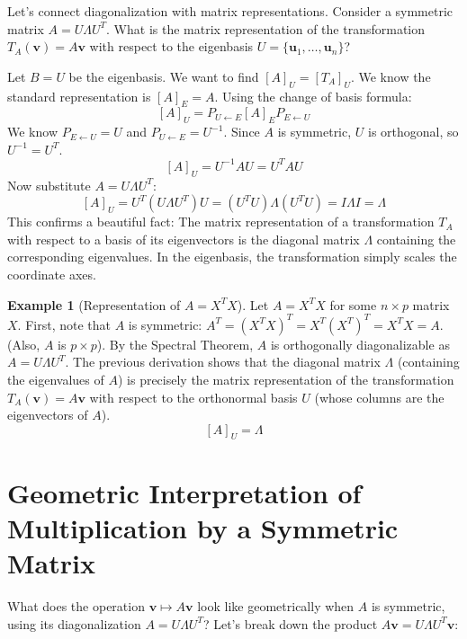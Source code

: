 \documentclass[11pt]{article}
\theoremstyle{definition}
\newtheorem{example}[theorem]{Example}
\theoremstyle{remark}
\begin{document}
Let's connect diagonalization with matrix representations. Consider a symmetric matrix $A = U \Lambda U^T$. What is the matrix representation of the transformation $T_A(\mathbf{v}) = A\mathbf{v}$ with respect to the eigenbasis $U = \{\mathbf{u}_1, \dots, \mathbf{u}_n\}$?

Let $B = U$ be the eigenbasis. We want to find $[A]_U = [T_A]_U$. We know the standard representation is $[A]_E = A$. Using the change of basis formula:
\[ [A]_U = P_{U \leftarrow E} [A]_E P_{E \leftarrow U} \]
We know $P_{E \leftarrow U} = U$ and $P_{U \leftarrow E} = U^{-1}$. Since $A$ is symmetric, $U$ is orthogonal, so $U^{-1} = U^T$.
\[ [A]_U = U^{-1} A U = U^T A U \]
Now substitute $A = U \Lambda U^T$:
\[ [A]_U = U^T (U \Lambda U^T) U = (U^T U) \Lambda (U^T U) = I \Lambda I = \Lambda \]
This confirms a beautiful fact: The matrix representation of a transformation $T_A$ with respect to a basis of its eigenvectors is the diagonal matrix $\Lambda$ containing the corresponding eigenvalues. In the eigenbasis, the transformation simply scales the coordinate axes.

\begin{example}[Representation of $A=X^TX$]
Let $A = X^T X$ for some $n \times p$ matrix $X$.
First, note that $A$ is symmetric: $A^T = (X^T X)^T = X^T (X^T)^T = X^T X = A$. (Also, $A$ is $p \times p$).
By the Spectral Theorem, $A$ is orthogonally diagonalizable as $A = U \Lambda U^T$.
The previous derivation shows that the diagonal matrix $\Lambda$ (containing the eigenvalues of $A$) is precisely the matrix representation of the transformation $T_A(\mathbf{v}) = A\mathbf{v}$ with respect to the orthonormal basis $U$ (whose columns are the eigenvectors of $A$).
\[ [A]_U = \Lambda \]
\end{example}

\section{Geometric Interpretation of Multiplication by a Symmetric Matrix}

What does the operation $\mathbf{v} \mapsto A\mathbf{v}$ look like geometrically when $A$ is symmetric, using its diagonalization $A = U \Lambda U^T$? Let's break down the product $A\mathbf{v} = U \Lambda U^T \mathbf{v}$:
\end{document}
